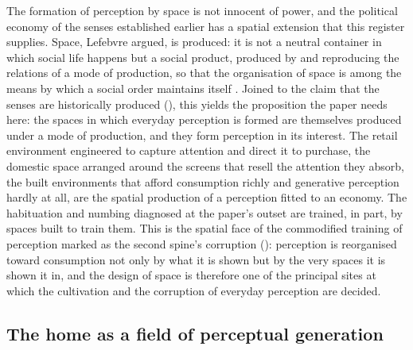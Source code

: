 The formation of perception by space is not innocent of power, and the political economy of the senses established earlier has a spatial extension that this register supplies. Space, Lefebvre argued, is produced: it is not a neutral container in which social life happens but a social product, produced by and reproducing the relations of a mode of production, so that the organisation of space is among the means by which a social order maintains itself \parencite{lefebvre1991}. Joined to the claim that the senses are historically produced (), this yields the proposition the paper needs here: the spaces in which everyday perception is formed are themselves produced under a mode of production, and they form perception in its interest. The retail environment engineered to capture attention and direct it to purchase, the domestic space arranged around the screens that resell the attention they absorb, the built environments that afford consumption richly and generative perception hardly at all, are the spatial production of a perception fitted to an economy. The habituation and numbing diagnosed at the paper's outset are trained, in part, by spaces built to train them. This is the spatial face of the commodified training of perception marked as the second spine's corruption (): perception is reorganised toward consumption not only by what it is shown but by the very spaces it is shown it in, and the design of space is therefore one of the principal sites at which the cultivation and the corruption of everyday perception are decided.

\subsection{The home as a field of perceptual generation}
\label{p23:sub:space-home}

